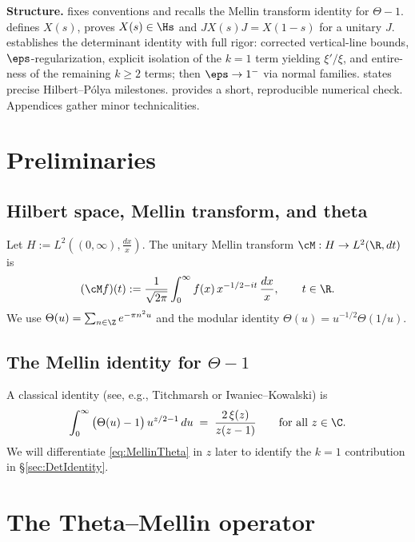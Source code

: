 \medskip
\noindent\textbf{Structure.}  fixes conventions and recalls the Mellin transform identity for \(\Theta-1\).  defines \(X(s)\), proves \(X(s)\in\Hs\) and \(JX(s)J=X(1-s)\) for a unitary \(J\).  establishes the determinant identity with full rigor: corrected vertical-line bounds, \(\eps\)-regularization, explicit isolation of the \(k=1\) term yielding \(\xi'/\xi\), and entire-ness of the remaining \(k\ge 2\) terms; then \(\eps\to1^-\) via normal families.  states precise Hilbert--Pólya milestones.  provides a short, reproducible numerical check. Appendices gather minor technicalities.

\section{Preliminaries}\label{sec:Preliminaries}

\subsection{Hilbert space, Mellin transform, and theta}
Let \(H:=L^2((0,\infty),\tfrac{dx}{x})\). The unitary Mellin transform \(\cM: H\to L^2(\R,dt)\) is
\begin{equation}\label{eq:Mellin}
(\cM f)(t) := \frac{1}{\sqrt{2\pi}}\int_0^\infty f(x)\, x^{-1/2-it}\,\frac{dx}{x} ,\qquad t\in\R.
\end{equation}
We use \(\Theta(u)=\sum_{n\in\Z} e^{-\pi n^2 u}\) and the modular identity \(\Theta(u)=u^{-1/2}\Theta(1/u)\).

\subsection{The Mellin identity for \texorpdfstring{$\Theta-1$}{Theta-1}}
A classical identity (see, e.g., Titchmarsh or Iwaniec--Kowalski) is
\begin{equation}\label{eq:MellinTheta}
\int_0^\infty \big(\Theta(u)-1\big)\, u^{z/2-1}\,du \;=\; \frac{2\,\xi(z)}{z(z-1)} \qquad \text{for all } z\in\C.
\end{equation}
We will differentiate \eqref{eq:MellinTheta} in \(z\) later to identify the \(k=1\) contribution in \S\ref{sec:DetIdentity}.

\section{The Theta--Mellin operator}\label{sec:Operator}


